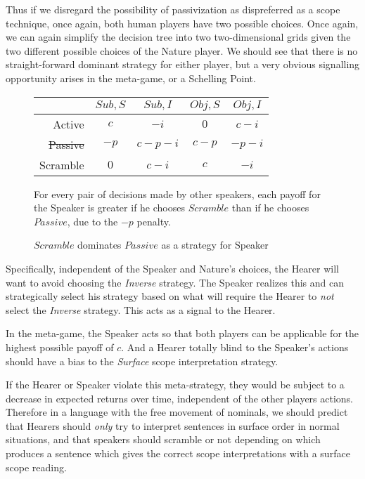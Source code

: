 \documentclass{article}
\begin{document}
Thus if we disregard the possibility of passivization as dispreferred as a scope technique, once again, both human players have two possible choices.
Once again, we can again simplify the decision tree into two two-dimensional grids given the two different possible choices of the Nature player.
We should see that there is no straight-forward dominant strategy for either player, but a very obvious signalling opportunity arises in the meta-game, or a Schelling Point.

\begin{figure}
	\begin{shaded}
\begin{center}
\begin{tabular}{r|cccc}
	&$Sub, S$ & $Sub, I$ & $Obj, S$ & $Obj, I$ \\\hline\hline
Active & $c$  & $-i$ & $0$  & $c-i$ \\
	\sout{Passive} & $-p$ & $c-p-i$  & $c-p$  & $-p-i$  \\
Scramble & $0$  & $c-i$ & $c$  & $-i$  \\
\end{tabular}
\end{center}
\small For every pair of decisions made by other speakers, each payoff for the Speaker is greater if he chooses $Scramble$ than if he chooses $Passive$, due to the $-p$ penalty.
	\caption{$Scramble$ dominates $Passive$ as a strategy for Speaker}
	\end{shaded}
\end{figure}

Specifically, independent of the Speaker and Nature's choices, the Hearer will want to avoid choosing the \emph{Inverse} strategy.
The Speaker realizes this and can strategically select his strategy based on what will require the Hearer to \emph{not} select the \emph{Inverse} strategy.
This acts as a signal to the Hearer.

In the meta-game, the Speaker acts so that both players can be applicable for the highest possible payoff of $c$.
And a Hearer totally blind to the Speaker's actions should have a bias to the \emph{Surface} scope interpretation strategy.

If the Hearer or Speaker violate this meta-strategy, they would be subject to a decrease in expected returns over time, independent of the other players actions.
Therefore in a language with the free movement of nominals, we should predict that Hearers should \emph{only} try to interpret sentences in surface order in normal situations, and that speakers should scramble or not depending on which produces a sentence which gives the correct scope interpretations with a surface scope reading.
\end{document}
